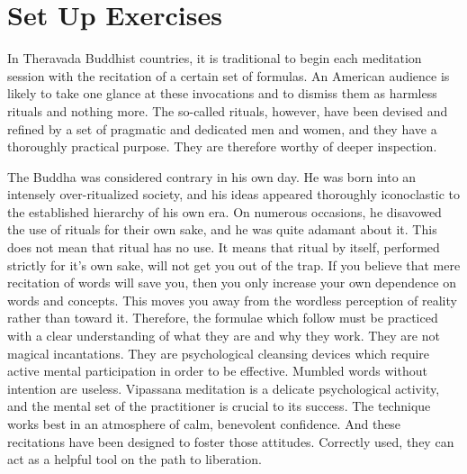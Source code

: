 \chapter{Set Up Exercises} 
In Theravada Buddhist countries, it is traditional to begin each meditation
session with the recitation of a certain set of formulas.  An American audience
is likely to take one glance at these invocations and to dismiss them as
harmless rituals and nothing more.  The so-called rituals, however, have been
devised and refined by a set of pragmatic and dedicated men and women, and they
have a thoroughly practical purpose. They are therefore worthy of deeper
inspection.

The Buddha was considered contrary in his own day. He was born into an intensely
over-ritualized society, and his ideas appeared thoroughly iconoclastic to the
established hierarchy of his own era. On numerous occasions, he disavowed the
use of rituals for their own sake, and he was quite adamant about it. This does
not mean that ritual has no use. It means that ritual by itself, performed
strictly for it's own sake, will not get you out of the trap. If you believe
that mere recitation of words will save you, then you only increase your own
dependence on words and concepts. This moves you away from the wordless
perception of reality rather than toward it. Therefore, the formulae which
follow must be practiced with a clear understanding of what they are and why
they work. They are not magical incantations. They are psychological cleansing
devices which require active mental participation in order to be effective.
Mumbled words without intention are useless. Vipassana meditation is a delicate
psychological activity, and the mental set of the practitioner is crucial to its
success. The technique works best in an atmosphere of calm, benevolent
confidence. And these recitations have been designed to foster those attitudes.
Correctly used, they can act as a helpful tool on the path to liberation.

